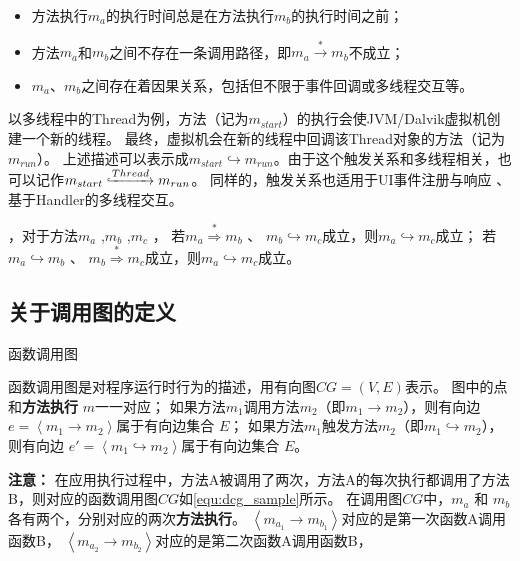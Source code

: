 	\begin{itemize}
		\setlength{\itemsep}{-5pt}
		\item  方法执行$m_a$的执行时间总是在方法执行$m_b$的执行时间之前；
		\item 方法$m_a$和$m_b$之间不存在一条调用路径，即$m_a \stackrel{\ast}{\to} m_b $不成立；
		\item $m_a$、$m_b$之间存在着因果关系，包括但不限于事件回调或多线程交互等。
	\end{itemize}


以多线程中的Thread为例，方法（记为$m_{start}$）的执行会使JVM/Dalvik虚拟机创建一个新的线程。
最终，虚拟机会在新的线程中回调该Thread对象的方法（记为$m_{run}$）。
上述描述可以表示成$m_{start} \hookrightarrow m_{run}$。由于这个触发关系和多线程相关，也可以记作$m_{start} \lhook\joinrel\xrightarrow{Thread}  m_{run} $。
同样的，触发关系也适用于UI事件注册与响应 、基于Handler的多线程交互。

，对于方法$m_a$ ,$m_b$ ,$m_c$ ，
若$m_a  \stackrel{\ast}{ \Rightarrow } m_b$ 、 $m_b \hookrightarrow m_c$成立，则$m_a \hookrightarrow m_c$成立；
若$m_a  \hookrightarrow m_b$ 、 $m_b \stackrel{\ast}{ \Rightarrow }  m_c$成立，则$m_a \hookrightarrow m_c$成立。

\subsection{关于调用图的定义}

\begin{Def}
	函数调用图%
\end{Def}	


	函数调用图是对程序运行时行为的描述，用有向图$CG = ( V , E)$表示。 图中的点和\textbf{方法执行} $m$一一对应；
	如果方法$m_1$调用方法$m_2$（即$m_1 \to m_2$），则有向边 $e = \left\langle m_1  \to m_2 \right\rangle $属于有向边集合 $E$；
	如果方法$m_1$触发方法$m_2$（即$m_1 \hookrightarrow m_2$），则有向边 $e' = \left\langle m_1  \hookrightarrow m_2 \right\rangle $属于有向边集合 $E$。 


\textbf{注意：}
在应用执行过程中，方法A被调用了两次，方法A的每次执行都调用了方法B，则对应的函数调用图$CG$如\autoref{equ:dcg_sample}所示。
在调用图$CG$中，$m_a$ 和 $m_b$ 各有两个，分别对应的两次\textbf{方法执行}。
$\left\langle m_{a_{1}} \to m_{b_{1}}\right\rangle $对应的是第一次函数A调用函数B，
$\left\langle m_{a_{2}} \to m_{b_{2}} \right\rangle    $对应的是第二次函数A调用函数B，

